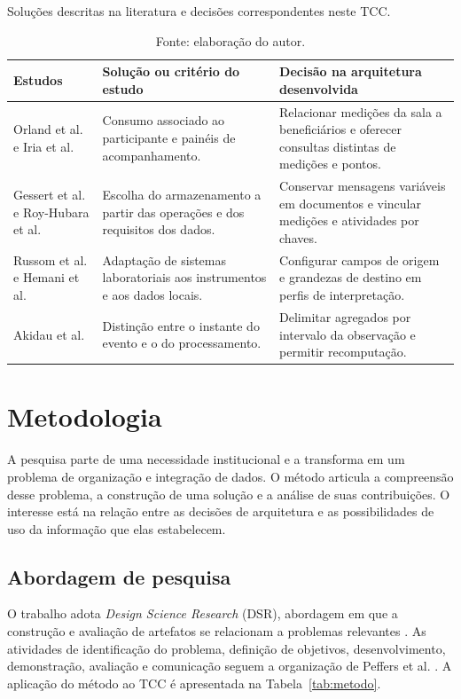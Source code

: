 \documentclass[tcc,capa]{texufpel}
\newif\ifemrevisao
\newcommand{\tintarevisao}{\ifemrevisao\color{correvisao}\fi}
\DeclareRobustCommand{\rev}[1]{{\tintarevisao #1}}
\begin{document}
\begin{table}[H]\centering\small\tintarevisao
\caption{\rev{Soluções descritas na literatura e decisões correspondentes neste TCC.}}\label{tab:relacionados}
\renewcommand{\arraystretch}{1.15}
\begin{tabularx}{\textwidth}{>{\raggedright\arraybackslash}p{3.0cm}YY}\toprule
Estudos & Solução ou critério do estudo & Decisão na arquitetura desenvolvida \\\midrule
Orland et al. e Iria et al. & Consumo associado ao participante e painéis de acompanhamento. & Relacionar medições da sala a beneficiários e oferecer consultas distintas de medições e pontos. \\
Gessert et al. e Roy-Hubara et al. & Escolha do armazenamento a partir das operações e dos requisitos dos dados. & Conservar mensagens variáveis em documentos e vincular medições e atividades por chaves. \\
Russom et al. e Hemani et al. & Adaptação de sistemas laboratoriais aos instrumentos e aos dados locais. & Configurar campos de origem e grandezas de destino em perfis de interpretação. \\
Akidau et al. & Distinção entre o instante do evento e o do processamento. & Delimitar agregados por intervalo da observação e permitir recomputação. \\\bottomrule
\end{tabularx}
\caption*{Fonte: elaboração do autor.}
\end{table}

\chapter{Metodologia}\label{cap:metodo}
A pesquisa parte de uma necessidade institucional e a transforma em um problema de organização e integração de dados. O método articula a compreensão desse problema, a construção de uma solução e a análise de suas contribuições. O interesse está na relação entre as decisões de arquitetura e as possibilidades de uso da informação que elas estabelecem.

\section{Abordagem de pesquisa}
O trabalho adota \emph{Design Science Research} (DSR), abordagem em que a construção e avaliação de artefatos se relacionam a problemas relevantes \cite{hevner2004}. As atividades de identificação do problema, definição de objetivos, desenvolvimento, demonstração, avaliação e comunicação seguem a organização de Peffers et al. \cite{peffers2007}. A aplicação do método ao TCC é apresentada na Tabela~\ref{tab:metodo}.
\end{document}
